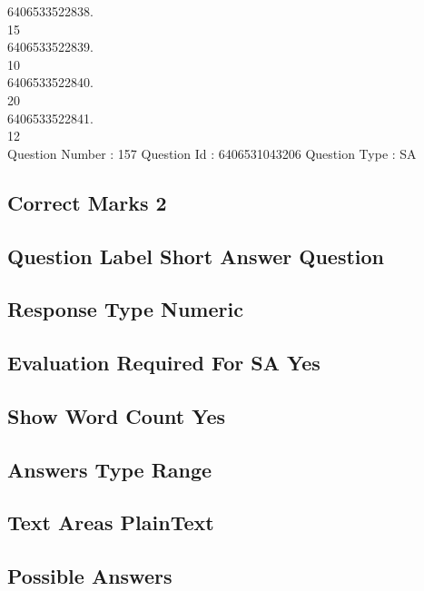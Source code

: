 \documentclass{article}
\begin{document}
6406533522838.\\

15\\

6406533522839.\\

10\\

6406533522840.\\

20\\

6406533522841.\\

12\\

Question Number : 157 Question Id : 6406531043206 Question Type : SA\\

\subsection{Correct Marks  2}

\subsection{Question Label  Short Answer Question}

\subsection{Response Type  Numeric}

\subsection{Evaluation Required For SA  Yes}

\subsection{Show Word Count  Yes}

\subsection{Answers Type  Range}

\subsection{Text Areas  PlainText}

\subsection{Possible Answers }
\end{document}
